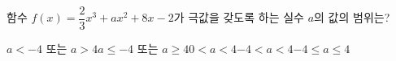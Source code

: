 함수 $f(x)=\dfrac{2}{3}x^3+ax^2+8x-2$가 극값을 갖도록 하는 실수 $a$의 값의 범위는?
\begin{choicesii}{$a<-4$ 또는 $a>4$}{$a\le -4$ 또는 $a\ge 4$}{$0<a<4$}{$-4<a<4$}{$-4\le a\le 4$}\end{choicesii}
